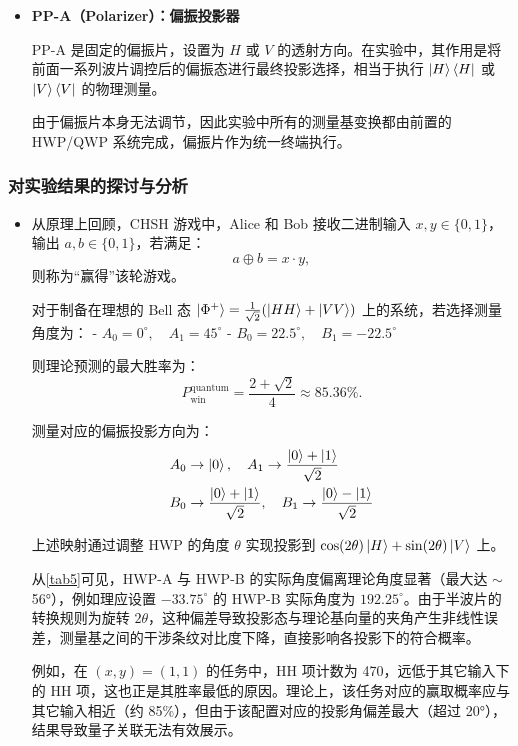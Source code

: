 \begin{itemize}
	\item \textbf{PP-A（Polarizer）：偏振投影器}
	
	PP-A 是固定的偏振片，设置为 $H$ 或 $V$ 的透射方向。在实验中，其作用是将前面一系列波片调控后的偏振态进行最终投影选择，相当于执行 $\ket{H}\bra{H}$ 或 $\ket{V}\bra{V}$ 的物理测量。
	
	由于偏振片本身无法调节，因此实验中所有的测量基变换都由前置的 HWP/QWP 系统完成，偏振片作为统一终端执行。
	
\end{itemize}

\subsubsection{对实验结果的探讨与分析}
\begin{itemize}
	\item 从原理上回顾，CHSH 游戏中，Alice 和 Bob 接收二进制输入 $x, y \in \{0, 1\}$，输出 $a, b \in \{0,1\}$，若满足：
	\[
	a \oplus b = x \cdot y,
	\]
	则称为“赢得”该轮游戏。
	
	对于制备在理想的 Bell 态 $\ket{\Phi^+} = \frac{1}{\sqrt{2}}(\ket{HH} + \ket{VV})$ 上的系统，若选择测量角度为：
	- $A_0 = 0^\circ,\quad A_1 = 45^\circ$
	- $B_0 = 22.5^\circ,\quad B_1 = -22.5^\circ$
	
	则理论预测的最大胜率为：
	\[
	P_{\text{win}}^{\text{quantum}} = \frac{2 + \sqrt{2}}{4} \approx 85.36\%.
	\]
	
	测量对应的偏振投影方向为：
	\[
	\begin{aligned}
		A_0 &\rightarrow \ket{0},\quad A_1 \rightarrow \frac{\ket{0} + \ket{1}}{\sqrt{2}} \\
		B_0 &\rightarrow \frac{\ket{0} + \ket{1}}{\sqrt{2}},\quad B_1 \rightarrow \frac{\ket{0} - \ket{1}}{\sqrt{2}} \\
	\end{aligned}
	\]
	
	上述映射通过调整 HWP 的角度 $\theta$ 实现投影到 $\cos(2\theta)\ket{H} + \sin(2\theta)\ket{V}$ 上。
	
	从\cref{tab5}可见，HWP-A 与 HWP-B 的实际角度偏离理论角度显著（最大达 $\sim$ 56°），例如理应设置 $-33.75^\circ$ 的 HWP-B 实际角度为 $192.25^\circ$。由于半波片的转换规则为旋转 $2\theta$，这种偏差导致投影态与理论基向量的夹角产生非线性误差，测量基之间的干涉条纹对比度下降，直接影响各投影下的符合概率。
	
	例如，在 $(x,y)=(1,1)$ 的任务中，HH 项计数为 470，远低于其它输入下的 HH 项，这也正是其胜率最低的原因。理论上，该任务对应的赢取概率应与其它输入相近（约 85\%），但由于该配置对应的投影角偏差最大（超过 20°），结果导致量子关联无法有效展示。
	

\end{itemize}

